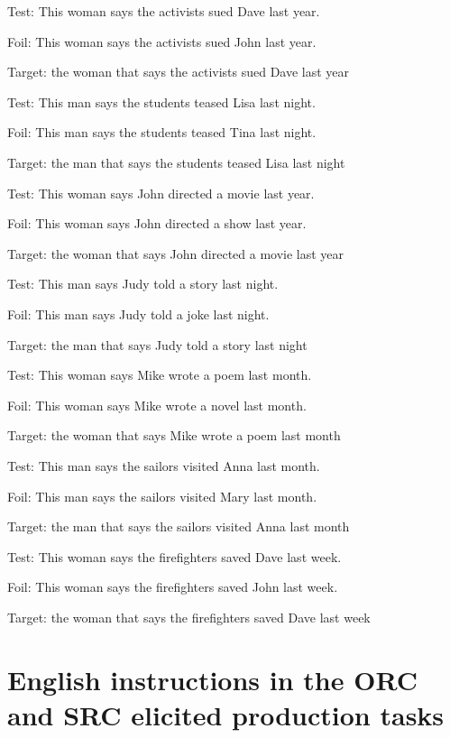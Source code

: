 \ex %
Test: This woman says the activists sued Dave last year.\par\nobreak
Foil: This woman says the activists sued John last year.\par\nobreak
Target: the woman that says the activists sued Dave last year
\xe

\ex %
Test: This man says the students teased Lisa last night.\par\nobreak
Foil: This man says the students teased Tina last night.\par\nobreak
Target: the man that says the students teased Lisa last night
\xe

\ex %
Test: This woman says John directed a movie last year.\par\nobreak
Foil: This woman says John directed a show last year.\par\nobreak
Target: the woman that says John directed a movie last year
\xe

\ex %
Test: This man says Judy told a story last night.\par\nobreak
Foil: This man says Judy told a joke last night.\par\nobreak
Target: the man that says Judy told a story last night
\xe

\ex %
Test: This woman says Mike wrote a poem last month.\par\nobreak
Foil: This woman says Mike wrote a novel last month.\par\nobreak
Target: the woman that says Mike wrote a poem last month
\xe

\ex %
Test: This man says the sailors visited Anna last month.\par\nobreak
Foil: This man says the sailors visited Mary last month.\par\nobreak
Target: the man that says the sailors visited Anna last month
\xe

\ex %
Test: This woman says the firefighters saved Dave last week.\par\nobreak
Foil: This woman says the firefighters saved John last week.\par\nobreak
Target: the woman that says the firefighters saved Dave last week
\xe

\section{English instructions in the ORC and SRC elicited production tasks}

